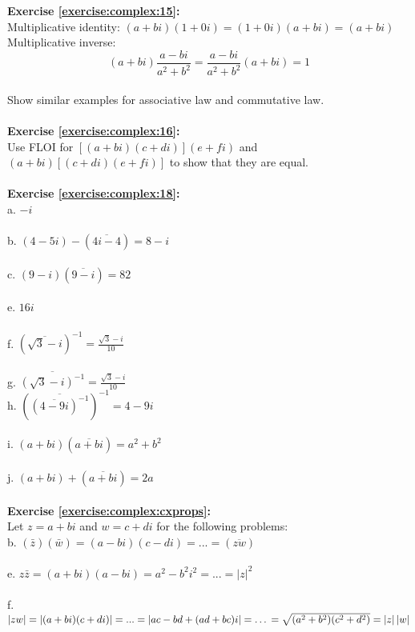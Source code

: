 \textbf{Exercise \ref{exercise:complex:15}:}\\
Multiplicative identity: $(a+bi)(1+0i)=(1+0i)(a+bi)=(a+bi)$\\
Multiplicative inverse: $$(a+bi)\frac{a-bi}{a^{2}+b^{2}}= \frac{a-bi}{a^{2}+b^{2}}(a+bi)=1$$\\
Show similar examples for associative law and commutative law.\\
\\
\textbf{Exercise \ref{exercise:complex:16}:}\\
Use FLOI for $[(a+bi)(c+di)](e+fi)$ and $(a+bi)[(c+di)(e+fi)]$ to show that they are equal.\\
\\
\textbf{Exercise \ref{exercise:complex:18}:}\\
a. $-i$\\
\\
b. $ (4-5i)-(\overline{4i-4})=8-i$\\
\\
c. $(9-i)(\overline{9-i})=82$\\
\\
e. $16i$\\
\\
f. $(\overline{\sqrt{3}-i})^{-1}=\displaystyle\frac{\sqrt{3}-i}{10}$\\
\\
g. $\overline{(\sqrt{3}-i)^{-1}}=\displaystyle\frac{\sqrt{3}-i}{10}$\newline
\\
h. $(\overline{(\overline{4-9i})^{-1}})^{-1}=4-9i$\\
\\
i. $(a+bi)(\overline{a+bi})=a^{2}+b^{2}$\\
\\
j. $(a+bi)+(\overline{a+bi})=2a$\\
\\
\textbf{Exercise \ref{exercise:complex:cxprops}:}\\
Let $z=a+bi$ and $w=c+di$ for the following problems:\\
b. $(\bar{z})(\bar{w})=(a-bi)(c-di)=...=(\overline{zw})$\\
\\
e. $z \bar{z}=(a+bi)(a-bi)=a^{2}-b^{2}i^{2}=...=\left|z\right|^{2}$\\
\\
f. $\left|zw\right|=\left|(a+bi)(c+di)\right|=...=\left|ac-bd+(ad+bc)i\right|= \ldots \\
=\sqrt{(a^{2}+b^{2})(c^{2}+d^{2})}=\left|z\right|\left|w\right|$\\
